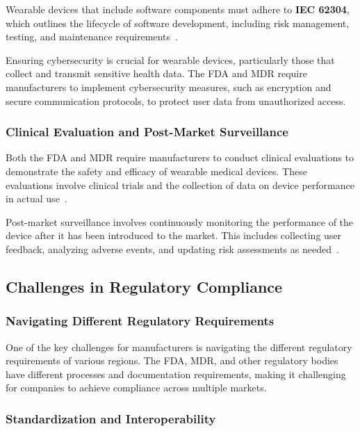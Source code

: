 \documentclass[journal]{IEEEtran}
\begin{document}
        Wearable devices that include software components must adhere to \textbf{IEC 62304}, which outlines the lifecycle of software development, including risk management, testing, and maintenance requirements~\cite{IEC2006}.

        Ensuring cybersecurity is crucial for wearable devices, particularly those that collect and transmit sensitive health data. The FDA and MDR require manufacturers to implement cybersecurity measures, such as encryption and secure communication protocols, to protect user data from unauthorized access.

        \subsubsection{Clinical Evaluation and Post-Market Surveillance}

        Both the FDA and MDR require manufacturers to conduct clinical evaluations to demonstrate the safety and efficacy of wearable medical devices. These evaluations involve clinical trials and the collection of data on device performance in actual use~\cite{Dias2018}.

        Post-market surveillance involves continuously monitoring the performance of the device after it has been introduced to the market. This includes collecting user feedback, analyzing adverse events, and updating risk assessments as needed~\cite{EuropeanUnion2024}.

    \subsection{Challenges in Regulatory Compliance}

        \subsubsection{Navigating Different Regulatory Requirements}

        One of the key challenges for manufacturers is navigating the different regulatory requirements of various regions. The FDA, MDR, and other regulatory bodies have different processes and documentation requirements, making it challenging for companies to achieve compliance across multiple markets.

        \subsubsection{Standardization and Interoperability}
\end{document}
